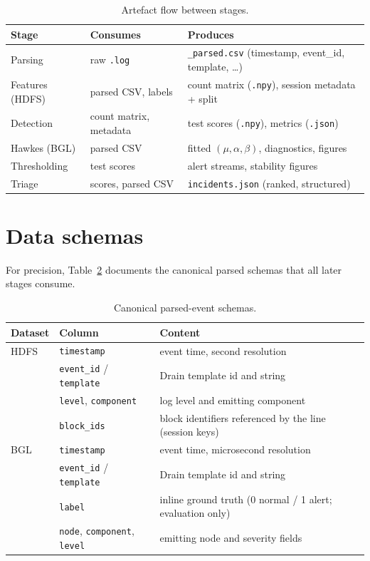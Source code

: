 \documentclass[11pt,a4paper]{report}
\newcommand{\code}[1]{\texttt{\small #1}}
\begin{document}
\begin{table}[H]
\centering
\caption{Artefact flow between stages.}
\label{tab:artefacts}
\small
\renewcommand{\arraystretch}{1.25}
\begin{tabular}{@{}l l l@{}}
\toprule
\textbf{Stage} & \textbf{Consumes} & \textbf{Produces} \\
\midrule
Parsing & raw \code{.log} & \code{*\_parsed.csv} (timestamp, event\_id,
template, \dots) \\
Features (HDFS) & parsed CSV, labels & count matrix (\code{.npy}), session
metadata + split \\
Detection & count matrix, metadata & test scores (\code{.npy}), metrics
(\code{.json}) \\
Hawkes (BGL) & parsed CSV & fitted $(\mu,\alpha,\beta)$, diagnostics,
figures \\
Thresholding & test scores & alert streams, stability figures \\
Triage & scores, parsed CSV & \code{incidents.json} (ranked, structured) \\
\bottomrule
\end{tabular}
\end{table}

\section{Data schemas}
\label{sec:method-schemas}
For precision, Table~\ref{tab:schemas} documents the canonical parsed
schemas that all later stages consume.

\begin{table}[H]
\centering
\caption{Canonical parsed-event schemas.}
\label{tab:schemas}
\small
\renewcommand{\arraystretch}{1.25}
\begin{tabular}{@{}l l p{7.2cm}@{}}
\toprule
\textbf{Dataset} & \textbf{Column} & \textbf{Content} \\
\midrule
HDFS & \code{timestamp} & event time, second resolution \\
 & \code{event\_id} / \code{template} & Drain template id and string \\
 & \code{level}, \code{component} & log level and emitting component \\
 & \code{block\_ids} & block identifiers referenced by the line (session
 keys) \\
\midrule
BGL & \code{timestamp} & event time, microsecond resolution \\
 & \code{event\_id} / \code{template} & Drain template id and string \\
 & \code{label} & inline ground truth (0 normal / 1 alert; evaluation
 only) \\
 & \code{node}, \code{component}, \code{level} & emitting node and
 severity fields \\
\bottomrule
\end{tabular}
\end{table}
\end{document}
